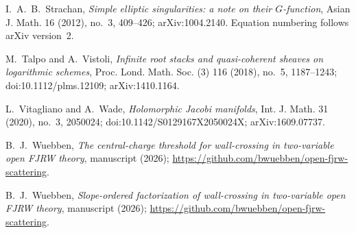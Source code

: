  I.~A.~B.~Strachan,
\emph{Simple elliptic singularities: a note on their $G$-function},
Asian J. Math. 16 (2012), no.~3, 409--426; arXiv:1004.2140.
Equation numbering follows arXiv version~2.

 M.~Talpo and A.~Vistoli,
\emph{Infinite root stacks and quasi-coherent sheaves on logarithmic schemes},
Proc. Lond. Math. Soc. (3) 116 (2018), no.~5, 1187--1243;
doi:10.1112/plms.12109; arXiv:1410.1164.

 L.~Vitagliano and A.~Wade,
\emph{Holomorphic Jacobi manifolds}, Int. J. Math. 31 (2020), no.~3,
2050024; doi:10.1142/S0129167X2050024X; arXiv:1609.07737.

 B.~J.~Wuebben,
\emph{The central-charge threshold for wall-crossing in two-variable open
FJRW theory}, manuscript (2026);
\url{https://github.com/bwuebben/open-fjrw-scattering}.

 B.~J.~Wuebben,
\emph{Slope-ordered factorization of wall-crossing in two-variable open FJRW
theory}, manuscript (2026);
\url{https://github.com/bwuebben/open-fjrw-scattering}.
